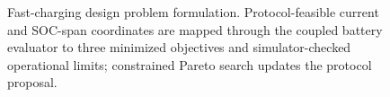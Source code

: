 \begin{figure}[!t]
{%
}
\caption{Fast-charging design problem formulation. Protocol-feasible current
and SOC-span coordinates are mapped through the coupled battery evaluator to
three minimized objectives and simulator-checked operational limits;
constrained Pareto search updates the protocol proposal.}
\label{fig:charging_problem}
\end{figure}
